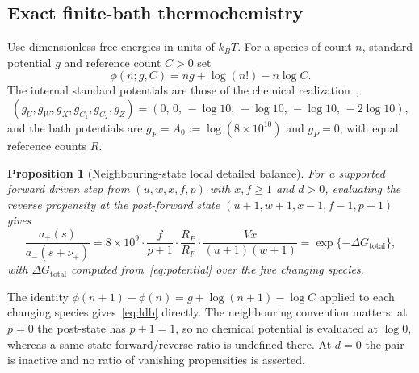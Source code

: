 \documentclass[11pt,a4paper]{article}
\theoremstyle{plain}
\newtheorem{proposition}[theorem]{Proposition}
\theoremstyle{definition}
\theoremstyle{remark}
\begin{document}
\subsection{Exact finite-bath thermochemistry}\label{sec:thermo}

Use dimensionless free energies in units of $k_BT$. For a species of count $n$, standard potential $g$ and reference count $C>0$ set
\begin{equation}\label{eq:potential}
\phi(n;g,C)=ng+\log(n!)-n\log C .
\end{equation}
The internal standard potentials are those of the chemical realization~\citep{thermo2026},
\[
(g_U,g_W,g_X,g_{C_1},g_{C_2},g_Z)=(0,\,0,\,-\log10,\,-\log10,\,-\log10,\,-2\log10),
\]
and the bath potentials are $g_F=A_0:=\log(8\times10^{10})$ and $g_P=0$, with equal reference counts $R$.

\begin{proposition}[Neighbouring-state local detailed balance]\label{prop:ldb}
For a supported forward driven step from $(u,w,x,f,p)$ with $x,f\ge1$ and $d>0$, evaluating the reverse propensity at the post-forward state $(u+1,w+1,x-1,f-1,p+1)$ gives
\begin{equation}\label{eq:ldb}
\frac{a_+(s)}{a_-(s+\nu_+)}=8\times10^{9}\cdot\frac{f}{p+1}\cdot\frac{R_P}{R_F}\cdot\frac{Vx}{(u+1)(w+1)}=\exp\{-\Delta G_{\mathrm{total}}\},
\end{equation}
with $\Delta G_{\mathrm{total}}$ computed from~\eqref{eq:potential} over the five changing species.
\end{proposition}
The identity $\phi(n+1)-\phi(n)=g+\log(n+1)-\log C$ applied to each changing species gives~\eqref{eq:ldb} directly. The neighbouring convention matters: at $p=0$ the post-state has $p+1=1$, so no chemical potential is evaluated at $\log 0$, whereas a same-state forward/reverse ratio is undefined there. At $d=0$ the pair is inactive and no ratio of vanishing propensities is asserted.
\end{document}
